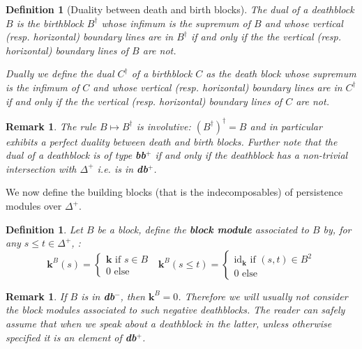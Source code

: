 \documentclass[a4paper, english, 11pt]{article}
\newcommand{\kk}[0]{\textbf{k}}
\newcommand{\0}{\vec{0}}
\newtheorem{remark}[prop]{Remark}
\newtheorem{defi}[prop]{Definition}
\begin{document}
\begin{defi}[Duality between death and birth blocks]
 \label{D:dualblocks} The dual  of a deathblock $B$ is the birthblock $B^\dagger$ whose infimum is the supremum of $B$ and whose vertical (resp. horizontal) boundary lines are in $B^\dagger$ if and only if the the vertical (resp. horizontal) boundary lines of $B$ are not. 
 
 Dually we define the dual $C^\dagger$ of a birthblock $C$ as the death block whose supremum is the infimum of $C$ and whose vertical (resp. horizontal) boundary lines are in $C^\dagger$ if and only if the the vertical (resp. horizontal) boundary lines of $C$ are not.
\end{defi}
\begin{remark}
 The rule $B\mapsto B^\dagger$ is involutive: $(B^\dagger)^\dagger=B$ and in particular exhibits a perfect duality between death and birth blocks.  Further note that the dual of a deathblock is of type \textbf{bb}$^{+}$ if and only if the deathblock has a non-trivial intersection with $\Delta^+$ i.e. is in \textbf{db}$^+$. 
\end{remark}


We now define the building blocks (that is the indecomposables) of persistence modules over $\Delta^+$.
\begin{defi}\label{Def:blockmodule}
Let $B$ be a block, define the \textbf{block module} associated to $B$ by, for any $s\leq t \in \Delta^+$, : 
$$\kk^B(s) = \begin{cases} \kk \text{~if~}s\in B \\ 0 \text{~else}
\end{cases} ~~~\kk^B(s\leq t) = \begin{cases} \text{id}_\kk \text{~if~} (s,t)\in B^2 \\ 0 \text{~else} \end{cases} $$
\end{defi}
\begin{remark}\label{R:trivaildbmoins}
 If $B$ is in \textbf{db}$^{-}$, then $\kk^B=0$. Therefore we will usually not consider the block modules associated to such negative deathblocks. The reader can safely assume that when we speak about a deathblock in the latter, unless otherwise specified it is an element of \textbf{db}$^+$.
\end{remark}
\end{document}
